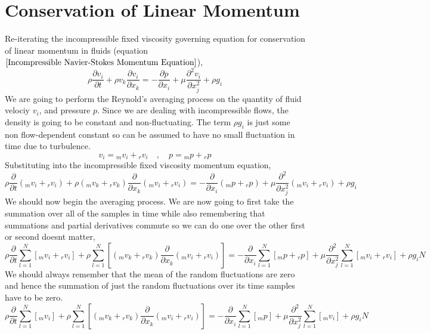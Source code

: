 \section{Conservation of Linear Momentum}
\begin{comment}
\end{comment}
Re-iterating the incompressible fixed viscosity governing equation for conservation of linear momentum in fluids (equation $\ref{Incompressible Navier-Stokes Momentum Equation}$),
$$\rho\frac{\partial v_{i}}{\partial t} + \rho v_{k}\frac{\partial v_{i}}{\partial x_{k}} = -\frac{\partial p}{\partial x_{i}} + \mu \frac{\partial^{2} v_{i}}{\partial x_{j}^{2}} + \rho g_{i} $$
We are going to perform the Reynold's averaging process on the quantity of fluid velociy $v_{i}$, and pressure $p$. 
Since we are dealing with incompressible flows, the density is going to be constant and non-fluctuating. 
The term $\rho g_{i}$ is just some non flow-dependent constant so can be assumed to have no small fluctuation in time due to turbulence.
$$v_{i} = {}_{m}v_{i} + {}_{r}v_{i} \quad,\quad p = {}_{m}p + {}_{r}p$$
Substituting into the incompressible fixed viscosity momentum equation,
$$\rho\frac{\partial }{\partial t}({}_{m}v_{i} + {}_{r}v_{i}) + \rho ({}_{m}v_{k} + {}_{r}v_{k})\frac{\partial }{\partial x_{k}}({}_{m}v_{i} + {}_{r}v_{i}) = -\frac{\partial }{\partial x_{i}}({}_{m}p + {}_{r}p) + \mu \frac{\partial^{2} }{\partial x_{j}^{2}}({}_{m}v_{i} + {}_{r}v_{i}) + \rho g_{i} $$
We should now begin the averaging process. 
We are now going to first take the summation over all of the samples in time while also remembering that summations and partial derivatives commute so we can do one over the other first or second doesnt matter,
$$\rho\frac{\partial }{\partial t}\sum^{N}_{l = 1}\left[{}_{m}v_{i} + {}_{r}v_{i}\right] + \rho\sum^{N}_{l = 1}\left[({}_{m}v_{k} + {}_{r}v_{k})\frac{\partial }{\partial x_{k}}({}_{m}v_{i} + {}_{r}v_{i})\right]  = -\frac{\partial }{\partial x_{i}}\sum^{N}_{l = 1}\left[{}_{m}p + {}_{r}p\right] + \mu \frac{\partial^{2} }{\partial x_{j}^{2}}\sum^{N}_{l = 1}\left[{}_{m}v_{i} + {}_{r}v_{i}\right] + \rho g_{i}N $$
We should always remember that the mean of the random fluctuations are zero and hence the summation of just the random fluctuations over its time samples have to be zero.
$$\rho\frac{\partial }{\partial t}\sum^{N}_{l = 1}\left[{}_{m}v_{i}\right] + \rho\sum^{N}_{l = 1}\left[({}_{m}v_{k} + {}_{r}v_{k})\frac{\partial }{\partial x_{k}}({}_{m}v_{i} + {}_{r}v_{i})\right]  = -\frac{\partial }{\partial x_{i}}\sum^{N}_{l = 1}\left[{}_{m}p\right] + \mu \frac{\partial^{2} }{\partial x_{j}^{2}}\sum^{N}_{l = 1}\left[{}_{m}v_{i}\right] + \rho g_{i}N $$
